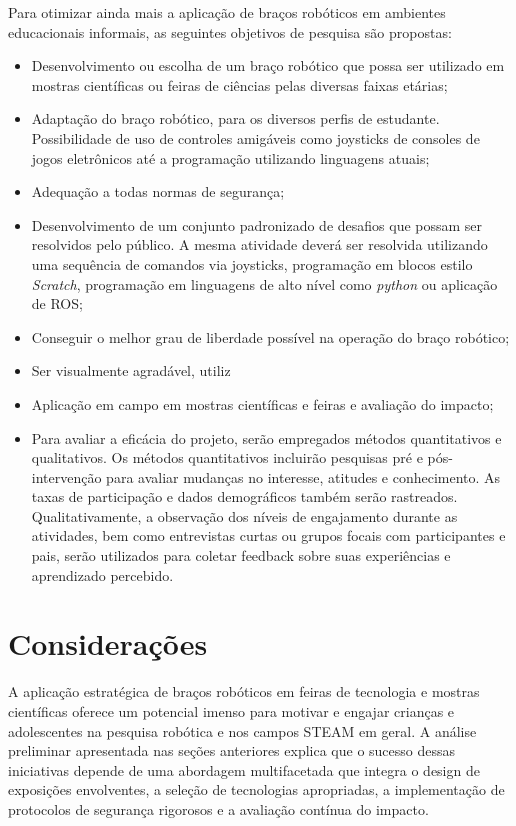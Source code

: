 \documentclass[%
  a4paper,%
  12pt,%
  fleqn,%
  english,%
  brazilian,%
]{article}
\begin{document}
Para otimizar ainda mais a aplicação de braços robóticos em ambientes educacionais informais, as seguintes objetivos de pesquisa são propostas:
	\begin{itemize}
		\item Desenvolvimento ou escolha de um braço robótico que possa ser utilizado em mostras científicas ou feiras de ciências pelas diversas faixas etárias;
		\item Adaptação do braço robótico, para os diversos perfis de estudante. Possibilidade de uso de controles amigáveis como joysticks de consoles de jogos eletrônicos até a programação utilizando linguagens atuais;
		\item Adequação a todas normas de segurança;
		\item Desenvolvimento de um conjunto padronizado de desafios que possam ser resolvidos pelo público. A mesma atividade deverá ser resolvida utilizando uma sequência de comandos via joysticks, programação em blocos estilo \emph{Scratch}, programação em linguagens de alto nível como \emph{python} ou aplicação de ROS;
		\item Conseguir o melhor grau de liberdade possível na operação do braço robótico;
		\item Ser visualmente agradável, utiliz
		\item Aplicação em campo em mostras científicas e feiras e avaliação do impacto;
		\item Para avaliar a eficácia do projeto, serão empregados métodos quantitativos e qualitativos. Os métodos quantitativos incluirão pesquisas pré e pós-intervenção para avaliar mudanças no interesse, atitudes e conhecimento. As taxas de participação e dados demográficos também serão rastreados. Qualitativamente, a observação dos níveis de engajamento durante as atividades, bem como entrevistas curtas ou grupos focais com participantes e pais, serão utilizados para coletar feedback sobre suas experiências e aprendizado percebido.
	\end{itemize}
	





\section{Considerações}
A aplicação estratégica de braços robóticos em feiras de tecnologia e mostras científicas oferece um potencial imenso para motivar e engajar crianças e adolescentes na pesquisa robótica e nos campos STEAM em geral. A análise preliminar apresentada nas seções anteriores explica que o sucesso dessas iniciativas depende de uma abordagem multifacetada que integra o design de exposições envolventes, a seleção de tecnologias apropriadas, a implementação de protocolos de segurança rigorosos e a avaliação contínua do impacto.
\end{document}
